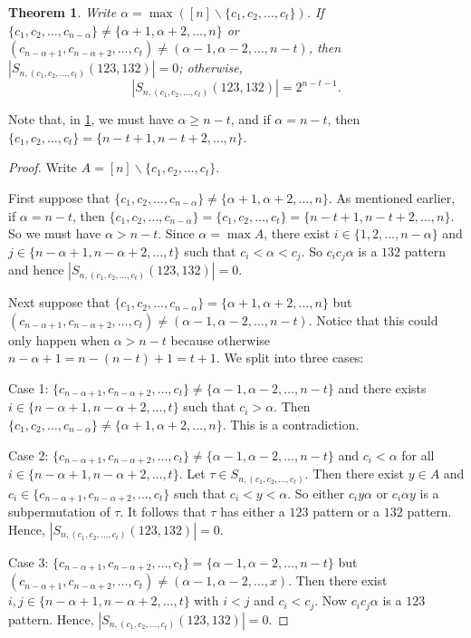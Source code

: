 \documentclass[11pt]{article}
\newtheorem{theorem}{Theorem}[section]
\theoremstyle{definition}
\numberwithin{equation}{section}
\begin{document}
\begin{theorem}\label{Theorem:LeadingTerms123;132}
Write $\alpha=\max([n]\backslash\{c_1,c_2,\ldots,c_t\})$. If $\{c_1,c_2,\ldots,c_{n-\alpha}\}\neq \{\alpha+1,\alpha+2,\ldots,n\}$ or $(c_{n-\alpha+1},c_{n-\alpha+2},\ldots,c_t)\neq (\alpha-1,\alpha-2,\ldots,n-t)$, then $|S_{n,(c_1,c_2,\ldots,c_t)}(123,132)|=0$; otherwise,
\[|S_{n,(c_1,c_2,\ldots,c_t)}(123,132)|=2^{n-t-1}.\]
\end{theorem}
Note that, in \cref{Theorem:LeadingTerms123;132}, we must have $\alpha\geq n-t$, and if $\alpha=n-t$, then $\{c_1,c_2,\ldots,c_t\}=\{n-t+1,n-t+2,\ldots,n\}$.
\begin{proof}
    Write $A=[n]\backslash\{c_1,c_2,\ldots,c_t\}$.

    First suppose that $\{c_1,c_2,\ldots,c_{n-\alpha}\}\neq \{\alpha+1,\alpha+2,\ldots,n\}$. As mentioned earlier, if $\alpha=n-t$, then $\{c_1,c_2,\ldots,c_{n-\alpha}\}=\{c_1,c_2,\ldots,c_t\}=\{n-t+1,n-t+2,\ldots,n\}$. So we must have $\alpha>n-t$. Since $\alpha=\max A$, there exist $i\in\{1,2,\ldots,n-\alpha\}$ and $j\in\{n-\alpha+1,n-\alpha+2,\ldots,t\}$ such that $c_i<\alpha<c_j$. So $c_ic_j\alpha$ is a $132$ pattern and hence $|S_{n,(c_1,c_2,\ldots,c_t)}(123,132)|=0$.

    Next suppose that $\{c_1,c_2,\ldots,c_{n-\alpha}\}=\{\alpha+1,\alpha+2,\ldots,n\}$ but $(c_{n-\alpha+1},c_{n-\alpha+2},\ldots,c_t)\neq (\alpha-1,\alpha-2,\ldots,n-t)$. Notice that this could only happen when $\alpha>n-t$ because otherwise $n-\alpha+1=n-(n-t)+1=t+1$. We split into three cases:

    Case 1: $\{c_{n-\alpha+1},c_{n-\alpha+2},\ldots,c_t\}\neq\{\alpha-1,\alpha-2,\ldots,n-t\}$ and there exists $i\in\{n-\alpha+1,n-\alpha+2,\ldots,t\}$ such that $c_i>\alpha$. Then $\{c_1,c_2,\ldots,c_{n-\alpha}\}\neq \{\alpha+1,\alpha+2,\ldots,n\}$. This is a contradiction.

    Case 2: $\{c_{n-\alpha+1},c_{n-\alpha+2},\ldots,c_t\}\neq\{\alpha-1,\alpha-2,\ldots,n-t\}$ and $c_i<\alpha$ for all $i\in\{n-\alpha+1,n-\alpha+2,\ldots,t\}$. Let $\tau\in S_{n,(c_1,c_2,\ldots,c_t)}$. Then there exist $y\in A$ and $c_i\in \{c_{n-\alpha+1},c_{n-\alpha+2},\ldots,c_t\}$ such that $c_i<y<\alpha$. So either $c_iy\alpha$ or $c_i\alpha y$ is a subpermutation of $\tau$. It follows that $\tau$ has either a $123$ pattern or a $132$ pattern. Hence, $|S_{n,(c_1,c_2,\ldots,c_t)}(123,132)|=0$.

    Case 3: $\{c_{n-\alpha+1},c_{n-\alpha+2},\ldots,c_t\}=\{\alpha-1,\alpha-2,\ldots,n-t\}$ but $(c_{n-\alpha+1},c_{n-\alpha+2},\ldots,c_t)\neq (\alpha-1,\alpha-2,\ldots,x)$. Then there exist $i,j\in\{n-\alpha+1,n-\alpha+2,\ldots,t\}$ with $i<j$ and $c_i<c_j$. Now $c_ic_j\alpha$ is a $123$ pattern. Hence, $|S_{n,(c_1,c_2,\ldots,c_t)}(123,132)|=0$.


\end{proof}
\end{document}
